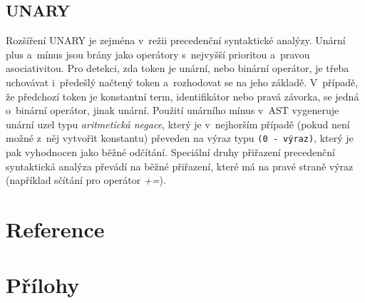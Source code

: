 \documentclass[11pt]{article}
\begin{document}
\subsection{UNARY}
Rozšíření UNARY je zejména v~režii precedenční syntaktické analýzy. Unární plus a~mínus jsou brány jako operátory s~nejvyšší prioritou a~pravou asociativitou. Pro detekci, zda token je unární, nebo binární operátor, je třeba uchovávat i~předešlý načtený token a~rozhodovat se na jeho základě. V~případě, že předchozí token je konstantní term, identifikátor nebo pravá závorka, se jedná o~binární operátor, jinak unární. Použití unárního mínus v~AST vygeneruje unární uzel typu \emph{aritmetická negace}, který je v~nejhorším případě (pokud není možné z~něj vytvořit konstantu) převeden na výraz typu \texttt{(0 - výraz)}, který je pak vyhodnocen jako běžné odčítání. Speciální druhy přiřazení precedenční syntaktická analýza převádí na běžné přiřazení, které má na pravé straně výraz (například sčítání pro operátor \textit{+=}).

\clearpage
\section{Reference}
\nocite{*}
\printbibliography[heading=none]

\section{Přílohy}
\end{document}

